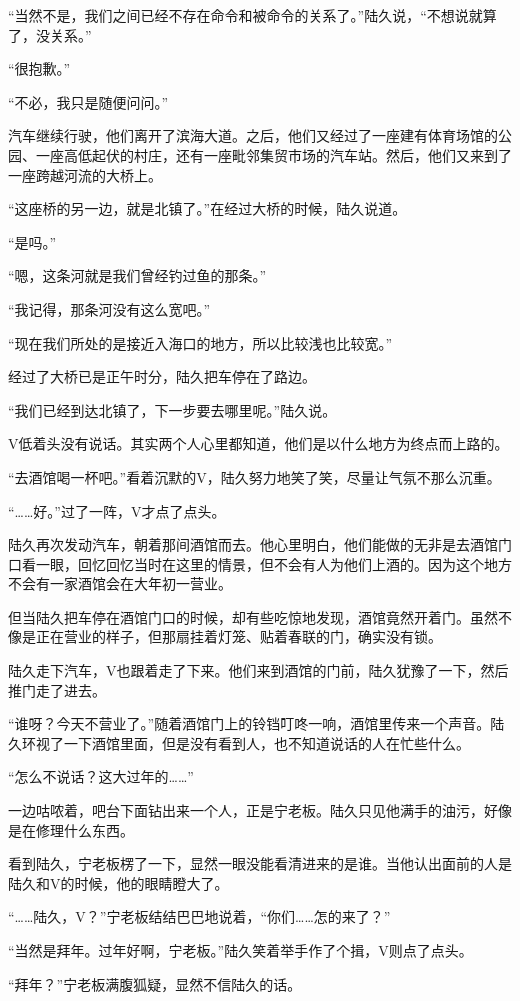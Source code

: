 “当然不是，我们之间已经不存在命令和被命令的关系了。”陆久说，“不想说就算了，没关系。”

“很抱歉。”

“不必，我只是随便问问。”

汽车继续行驶，他们离开了滨海大道。之后，他们又经过了一座建有体育场馆的公园、一座高低起伏的村庄，还有一座毗邻集贸市场的汽车站。然后，他们又来到了一座跨越河流的大桥上。

“这座桥的另一边，就是北镇了。”在经过大桥的时候，陆久说道。

“是吗。”

“嗯，这条河就是我们曾经钓过鱼的那条。”

“我记得，那条河没有这么宽吧。”

“现在我们所处的是接近入海口的地方，所以比较浅也比较宽。”

经过了大桥已是正午时分，陆久把车停在了路边。

“我们已经到达北镇了，下一步要去哪里呢。”陆久说。

V低着头没有说话。其实两个人心里都知道，他们是以什么地方为终点而上路的。

“去酒馆喝一杯吧。”看着沉默的V，陆久努力地笑了笑，尽量让气氛不那么沉重。

“……好。”过了一阵，V才点了点头。

陆久再次发动汽车，朝着那间酒馆而去。他心里明白，他们能做的无非是去酒馆门口看一眼，回忆回忆当时在这里的情景，但不会有人为他们上酒的。因为这个地方不会有一家酒馆会在大年初一营业。

但当陆久把车停在酒馆门口的时候，却有些吃惊地发现，酒馆竟然开着门。虽然不像是正在营业的样子，但那扇挂着灯笼、贴着春联的门，确实没有锁。

陆久走下汽车，V也跟着走了下来。他们来到酒馆的门前，陆久犹豫了一下，然后推门走了进去。

“谁呀？今天不营业了。”随着酒馆门上的铃铛叮咚一响，酒馆里传来一个声音。陆久环视了一下酒馆里面，但是没有看到人，也不知道说话的人在忙些什么。

“怎么不说话？这大过年的……”

一边咕哝着，吧台下面钻出来一个人，正是宁老板。陆久只见他满手的油污，好像是在修理什么东西。

看到陆久，宁老板楞了一下，显然一眼没能看清进来的是谁。当他认出面前的人是陆久和V的时候，他的眼睛瞪大了。

“……陆久，V？”宁老板结结巴巴地说着，“你们……怎的来了？”

“当然是拜年。过年好啊，宁老板。”陆久笑着举手作了个揖，V则点了点头。

“拜年？”宁老板满腹狐疑，显然不信陆久的话。

